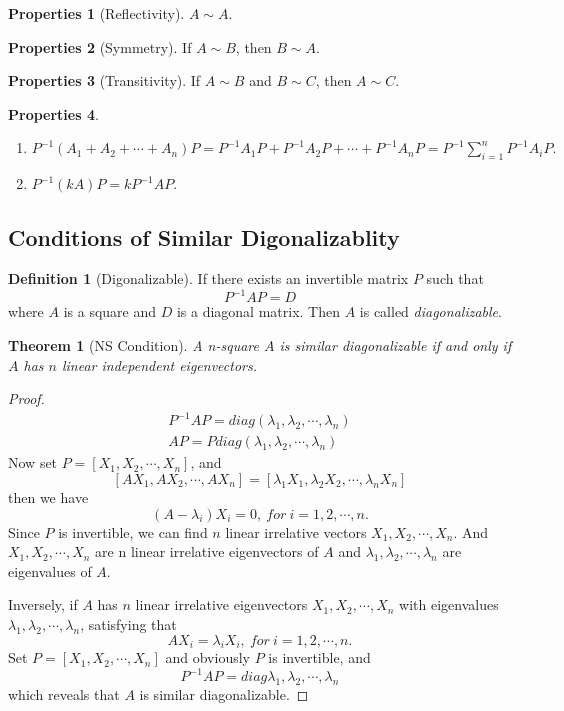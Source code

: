 \documentclass{article}
\newtheorem{theorem}{Theorem}[section]
\theoremstyle{definition}
\newtheorem{defi}{Definition}[section]
\newtheorem{pro}{Properties}[section]
\begin{document}
\begin{pro}[Reflectivity]
    $A\sim A$.
\end{pro}

\begin{pro}[Symmetry]
    If $A\sim B$, then $B\sim A$.
\end{pro}

\begin{pro}[Transitivity]
    If $A\sim B$ and $B\sim C$, then $A\sim C$.
\end{pro}


\begin{pro}
\begin{enumerate}
\item $P^{-1}(A_{1}+A_{2}+\cdots+A_{n})P=P^{-1}A_{1}P+P^{-1}A_{2}P+\cdots+P^{-1}A_{n}P=P^{-1}\sum_{i=1}^{n}P^{-1}A_{i}P.$
\item $P^{-1}(kA)P=kP^{-1}AP.$
\end{enumerate}
\end{pro}










\subsection{Conditions of Similar Digonalizablity}


\begin{defi}[Digonalizable]
    If there exists an invertible matrix $P$ such that
    $$P^{-1}AP=D$$
    where $A$ is a square and $D$ is a diagonal matrix.
    Then $A$ is called \textit{diagonalizable}.
\end{defi}

\begin{theorem}[NS Condition]
    A n-square $A$ is similar diagonalizable if and only if $A$ has $n$ linear independent eigenvectors.
\label{theorem:NS}
\end{theorem}

\begin{proof}
\begin{align*}
P^{-1}AP=diag(\lambda_{1},\lambda_{2},\cdots,\lambda_{n})\\
AP=Pdiag(\lambda_{1},\lambda_{2},\cdots,\lambda_{n})
\end{align*}
Now set $P=[X_{1},X_{2},\cdots,X_{n}]$, and 
$$[AX_{1},AX_{2},\cdots,AX_{n}]=[\lambda_{1}X_{1},\lambda_{2}X_{2},\cdots,\lambda_{n}X_{n}]$$
then we have $$(A-\lambda_{i})X_{i}=0,\ for\ i=1,2,\cdots,n.$$
Since $P$ is invertible, we can find $n$ linear irrelative vectors $X_{1},X_{2},\cdots,X_{n}$.
And $X_{1},X_{2},\cdots,X_{n}$ are n linear irrelative eigenvectors of $A$ and $\lambda_{1},\lambda_{2},\cdots,\lambda_{n}$ are 
eigenvalues of $A$.

Inversely, if $A$ has $n$ linear irrelative eigenvectors $X_{1},X_{2},\cdots,X_{n}$ with eigenvalues $\lambda_{1},\lambda_{2},\cdots,\lambda_{n}$,
satisfying that 
$$AX_{i}=\lambda_{i}X_{i},\ for\ i=1,2,\cdots,n.$$
Set $P=[X_{1},X_{2},\cdots,X_{n}]$ and obviously $P$ is invertible, and 
$$P^{-1}AP=diag{\lambda_{1},\lambda_{2},\cdots,\lambda_{n}}$$
which reveals that $A$ is similar diagonalizable.
\end{proof}
\end{document}
